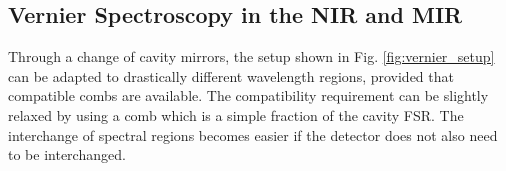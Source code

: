 \documentclass[12pt]{report}
\begin{document}
%	
%	
%	
	
	
	\subsection{Vernier Spectroscopy in the NIR and MIR}
	Through a change of cavity mirrors, the setup shown in Fig. \ref{fig:vernier_setup} can be adapted to drastically different wavelength regions, provided that compatible combs are available. The compatibility requirement can be slightly relaxed by using a comb which is a simple fraction of the cavity FSR. The interchange of spectral regions becomes easier if the detector does not also need to be interchanged. 
	
\end{document}

